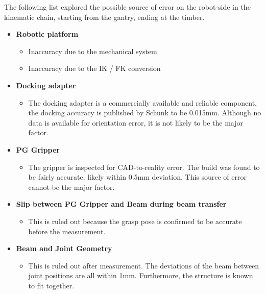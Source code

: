 {The following list explored the possible source of error on the robot-side in the kinematic chain, starting from the gantry, ending at the timber.

\begin{itemize}
	\item \textbf{Robotic platform}

\begin{itemize}
	\item Inaccuracy due to the mechanical system

	\item Inaccuracy due to the IK / FK conversion

\end{itemize}
	\item \textbf{Docking adapter}

\begin{itemize}
	\item The docking adapter is a commercially available and reliable component, the docking accuracy is published by Schunk to be 0.015mm. Although no data is available for orientation error, it is not likely to be the major factor.

\end{itemize}
    \item\textbf{PG Gripper}

\begin{itemize}
	\item The gripper is inspected for CAD-to-reality error. The build was found to be fairly accurate, likely within 0.5mm deviation. This source of error cannot be the major factor.

\end{itemize}
    \item\textbf{Slip between PG Gripper and Beam during beam transfer}

\begin{itemize}
	\item This is ruled out because the grasp pose is confirmed to be accurate before the measurement.

\end{itemize}
    \item\textbf{Beam and Joint Geometry}

\begin{itemize}
	\item This is ruled out after measurement. The deviations of the beam between joint positions are all within 1mm. Furthermore, the structure is known to fit together.


\end{itemize}
\end{itemize}}
